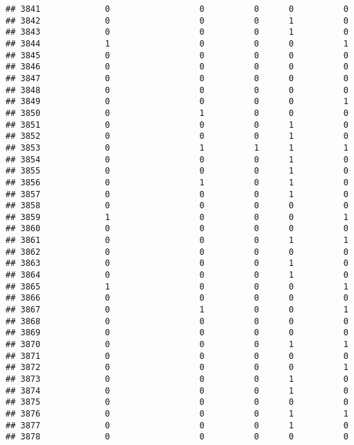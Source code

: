 \documentclass[
]{article}
\begin{document}
\begin{verbatim}
## 3841             0                  0          0      0          0
## 3842             0                  0          0      1          0
## 3843             0                  0          0      1          0
## 3844             1                  0          0      0          1
## 3845             0                  0          0      0          0
## 3846             0                  0          0      0          0
## 3847             0                  0          0      0          0
## 3848             0                  0          0      0          0
## 3849             0                  0          0      0          1
## 3850             0                  1          0      0          0
## 3851             0                  0          0      1          0
## 3852             0                  0          0      1          0
## 3853             0                  1          1      1          1
## 3854             0                  0          0      1          0
## 3855             0                  0          0      1          0
## 3856             0                  1          0      1          0
## 3857             0                  0          0      1          0
## 3858             0                  0          0      0          0
## 3859             1                  0          0      0          1
## 3860             0                  0          0      0          0
## 3861             0                  0          0      1          1
## 3862             0                  0          0      0          0
## 3863             0                  0          0      1          0
## 3864             0                  0          0      1          0
## 3865             1                  0          0      0          1
## 3866             0                  0          0      0          0
## 3867             0                  1          0      0          1
## 3868             0                  0          0      0          0
## 3869             0                  0          0      0          0
## 3870             0                  0          0      1          1
## 3871             0                  0          0      0          0
## 3872             0                  0          0      0          1
## 3873             0                  0          0      1          0
## 3874             0                  0          0      1          0
## 3875             0                  0          0      0          0
## 3876             0                  0          0      1          1
## 3877             0                  0          0      1          0
## 3878             0                  0          0      0          0

\end{verbatim}
\end{document}
